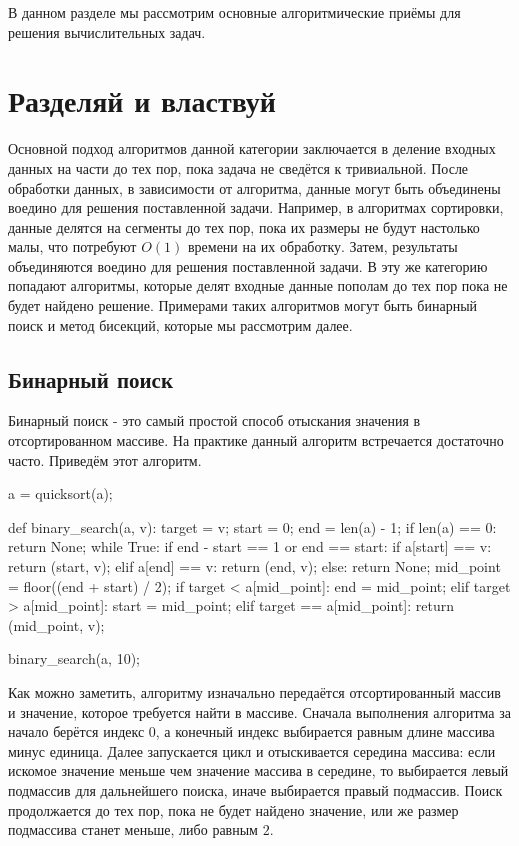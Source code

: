 В данном разделе мы рассмотрим основные алгоритмические приёмы 
для решения вычислительных задач. 

\section{Разделяй и властвуй}

Основной подход алгоритмов данной категории заключается 
в деление входных данных на части до тех пор, пока задача 
не сведётся к тривиальной. После обработки данных, в 
зависимости от алгоритма, данные могут быть объединены 
воедино для решения поставленной задачи. Например, 
в алгоритмах сортировки, данные делятся на 
сегменты до тех пор, пока их размеры не будут 
настолько малы, что потребуют $O(1)$ времени 
на их обработку. Затем, результаты объединяются 
воедино для решения поставленной задачи. 
В эту же категорию попадают алгоритмы, 
которые делят входные данные пополам до тех пор 
пока не будет найдено решение. Примерами
таких алгоритмов могут быть бинарный поиск и 
метод бисекций, которые мы рассмотрим далее.

\subsection{Бинарный поиск}

Бинарный поиск - это самый простой способ отыскания значения в 
отсортированном массиве. На практике данный алгоритм встречается 
достаточно часто. Приведём этот алгоритм.

\begin{python}
a = quicksort(a);

def binary_search(a, v):
	target = v;
	start = 0;
	end = len(a) - 1;
	if len(a) == 0:
		return None;
	while True:
		if end - start == 1 or end == start:
			if a[start] == v:
				return (start, v);
			elif a[end] == v:
				return (end, v);
			else:
				return None;
		mid_point = floor((end + start) / 2);
		if target < a[mid_point]:
			end = mid_point;
		elif target > a[mid_point]:
			start = mid_point;
		elif target == a[mid_point]:
			return (mid_point, v);

binary_search(a, 10);

\end{python}

Как можно заметить, алгоритму изначально 
передаётся отсортированный массив и значение, 
которое требуется найти в массиве. Сначала 
выполнения алгоритма за начало берётся 
индекс $0$, а конечный индекс выбирается
равным длине массива минус единица. Далее 
запускается цикл и отыскивается середина массива:
если искомое значение меньше чем значение массива
в середине, то выбирается левый подмассив для 
дальнейшего поиска, иначе выбирается правый подмассив.
Поиск продолжается до тех пор, пока не будет
найдено значение, или же размер подмассива 
станет меньше, либо равным $2$.

